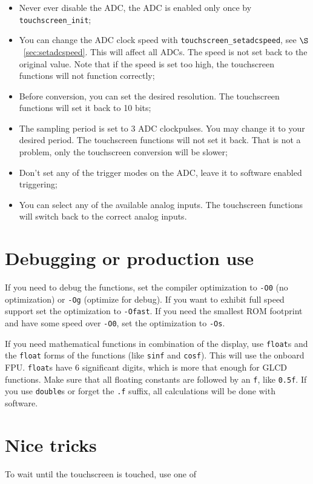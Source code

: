 \documentclass[12pt]{article}
\begin{document}
\begin{itemize}
\item Never ever disable the ADC, the ADC is enabled only once by \lstinline|touchscreen_init|;
\item You can change the ADC clock speed with \lstinline|touchscreen_setadcspeed|, see $\S$~\ref{sec:setadcspeed}. This will affect all ADCs. The speed is not set back to the original value. Note that if the speed is set too high, the touchscreen functions will not function correctly;
\item Before conversion, you can set the desired resolution. The touchscreen functions will set it back to 10 bits;
\item The sampling period is set to 3 ADC clockpulses. You may change it to your desired period. The touchscreen functions will not set it back. That is not a problem, only the touchscreen conversion will be slower;
\item Don't set any of the trigger modes on the ADC, leave it to software enabled triggering;
\item You can select any of the available analog inputs. The touchscreen functions will switch back to the correct analog inputs. 
\end{itemize}


\section{Debugging or production use}
If you need to debug the functions, set the compiler optimization to \lstinline|-O0| (no optimization) or \lstinline|-Og| (optimize for debug). If you want to exhibit full speed support set the optimization to \lstinline|-Ofast|. If you need the smallest ROM footprint and have some speed over \lstinline|-O0|, set the optimization to \lstinline|-Os|.

If you need mathematical functions in combination of the display, use \lstinline|float|s and the \lstinline|float| forms of the functions (like \lstinline|sinf| and \lstinline|cosf|). This will use the onboard FPU. \lstinline|float|s have 6 significant digits, which is more that enough for GLCD functions. Make sure that all floating constants are followed by an \lstinline|f|, like \lstinline|0.5f|. If you use \lstinline|double|s or forget the \lstinline|.f| suffix, all calculations will be done with software.

\section{Nice tricks}
To wait until the touchscreen is touched, use one of
\end{document}
